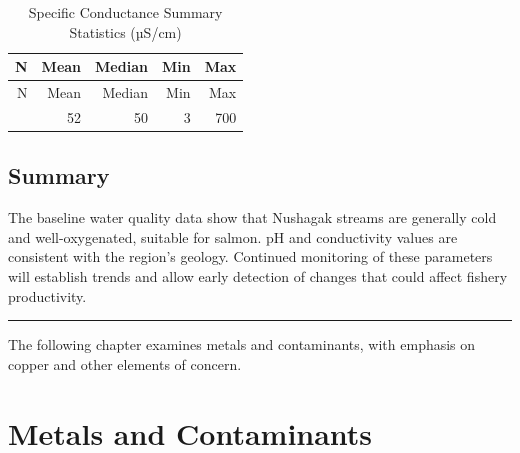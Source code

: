 \documentclass[
  letterpaper,
]{scrbook}
\begin{document}
\begin{longtable}[]{@{}rrrrr@{}}
\caption{Specific Conductance Summary Statistics (µS/cm)}\tabularnewline
\toprule\noalign{}
N & Mean & Median & Min & Max \\
\midrule\noalign{}
\endfirsthead
\toprule\noalign{}
N & Mean & Median & Min & Max \\
\midrule\noalign{}
\endhead
\bottomrule\noalign{}
\endlastfoot
488 & 52 & 50 & 3 & 700 \\
\end{longtable}

\section{Summary}\label{summary}

The baseline water quality data show that Nushagak streams are generally
cold and well-oxygenated, suitable for salmon. pH and conductivity
values are consistent with the region's geology. Continued monitoring of
these parameters will establish trends and allow early detection of
changes that could affect fishery productivity.

\begin{center}\rule{0.5\linewidth}{0.5pt}\end{center}

The following chapter examines metals and contaminants, with emphasis on
copper and other elements of concern.

\chapter{Metals and Contaminants}\label{metals-and-contaminants}
\end{document}
